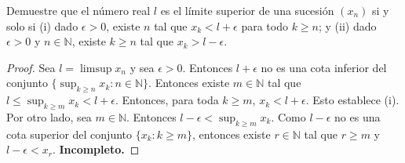 \documentclass[12pt]{article}
\newcommand{\N}{\mathbb{N}}
\newenvironment{problem}[2][Problema]{\begin{trivlist}
\item[\hskip \labelsep {\bfseries #1}\hskip \labelsep {\bfseries #2.}]}{\end{trivlist}}
\begin{document}
\begin{problem}{12}
Demuestre que el número real $l$ es el límite superior de una sucesión $(x_n)$ si y solo si (i) dado $\epsilon > 0 $, existe $n$ tal que $x_k < l + \epsilon$ para todo $k \geq n$; y (ii) dado $\epsilon > 0$ y $n\in \N$, existe $k \geq n$ tal que $x_k > l - \epsilon$. 
\end{problem}

\begin{proof}
Sea $l = \limsup{x_n}$ y sea $\epsilon > 0.$ Entonces $l + \epsilon$ no es una cota inferior del conjunto $\{ \sup_{k \geq n} x_k: n \in \N \}.$ Entonces existe $m \in \N$ tal que $l \leq  \sup_{k \geq m} x_k < l + \epsilon$. Entonces, para toda $k \geq m$, $x_k < l + \epsilon$. Esto establece (i).
Por otro lado, sea $m \in \N$. Entonces $l - \epsilon < \sup_{k \geq m} x_k $. Como $l - \epsilon $ no es una cota superior del conjunto $\{ x_k: k \geq m \}$, entonces existe $r \in \N$ tal que $r \geq m$ y $l - \epsilon < x_r$. \textbf{Incompleto.}

\end{proof}
\end{document}
